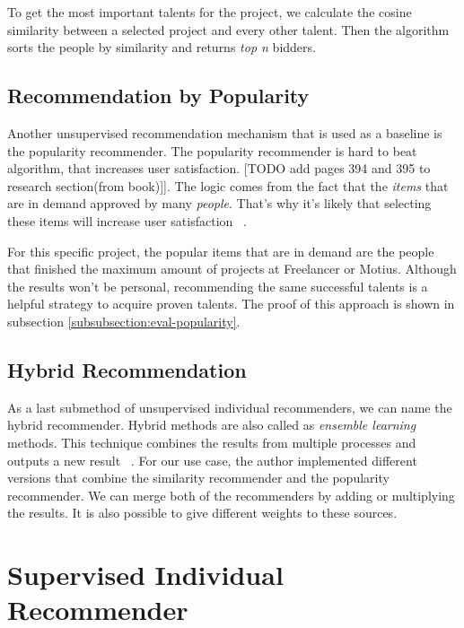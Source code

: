 To get the most important talents for the project, we calculate the cosine similarity between a selected project and every other talent. Then the algorithm sorts the people by similarity and returns \textit{top n} bidders.



\subsection{Recommendation by Popularity}


Another unsupervised recommendation mechanism that is used as a baseline is the popularity recommender. The popularity recommender is hard to beat algorithm, that increases user satisfaction. [TODO add pages 394 and 395 to research section(from book)]]. The logic comes from the fact that the \textit{items} that are in demand approved by many \textit{people}. That's why it's likely that selecting these items will increase user satisfaction ~\parencite{amatriain2015recommender}. 


For this specific project, the popular items that are in demand are the people that finished the maximum amount of projects at Freelancer or Motius. Although the results won't be personal, recommending the same successful talents is a helpful strategy to acquire proven talents. The proof of this approach is shown in subsection \ref{subsubsection:eval-popularity}.


\subsection{Hybrid Recommendation}\label{section:hybrid}

As a last submethod of unsupervised individual recommenders, we can name the hybrid recommender. Hybrid methods are also called as \textit{ensemble learning} methods. This technique combines the results from multiple processes and outputs a new result ~\parencite{beliakov2015aggregation}. For our use case, the author implemented different versions that combine the similarity recommender and the popularity recommender. We can merge both of the recommenders by adding or multiplying the results. It is also possible to give different weights to these sources.


\section{Supervised Individual Recommender}\label{section:supervised}

